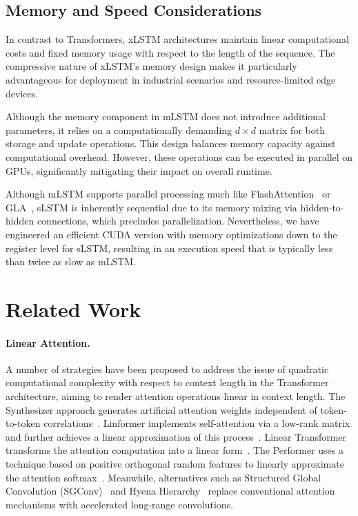 \subsection{Memory and Speed Considerations}

In contrast to Transformers, xLSTM architectures maintain linear computational costs and fixed memory usage with respect to the length of the sequence. The compressive nature of xLSTM's memory design makes it particularly advantageous for deployment in industrial scenarios and resource-limited edge devices.

Although the memory component in mLSTM does not introduce additional parameters, it relies on a computationally demanding $d \times d$ matrix for both storage and update operations. This design balances memory capacity against computational overhead. However, these operations can be executed in parallel on GPUs, significantly mitigating their impact on overall runtime.

Although mLSTM supports parallel processing much like FlashAttention~\citep{Dao:22,Dao:23} or GLA~\citep{Yang:23arxiv}, sLSTM is inherently sequential due to its memory mixing via hidden-to-hidden connections, which precludes parallelization. Nevertheless, we have engineered an efficient CUDA version with memory optimizations down to the register level for sLSTM, resulting in an execution speed that is typically less than twice as slow as mLSTM.

\section{Related Work}
\label{sec:related}

\paragraph{Linear Attention.} A number of strategies have been proposed to address the issue of quadratic computational complexity with respect to context length in the Transformer architecture, aiming to render attention operations linear in context length. The Synthesizer approach generates artificial attention weights independent of token-to-token correlations~\citep{Tay:20arxiv}. Linformer implements self-attention via a low-rank matrix and further achieves a linear approximation of this process~\citep{Wang:20arxiv}. Linear Transformer transforms the attention computation into a linear form~\citep{Katharopoulos:20}. The Performer uses a technique based on positive orthogonal random features to linearly approximate the attention softmax~\citep{Choromanski:21}. Meanwhile, alternatives such as Structured Global Convolution (SGConv)~\citep{Li:22} and Hyena Hierarchy~\citep{Poli:23} replace conventional attention mechanisms with accelerated long-range convolutions.

